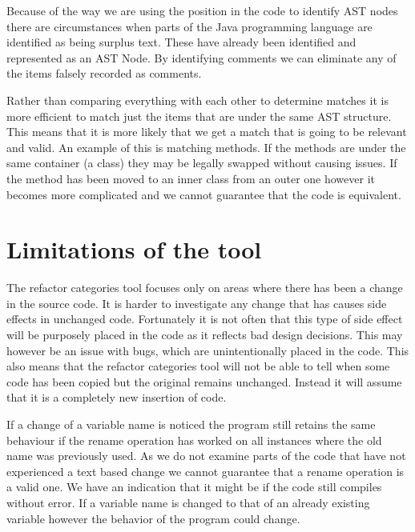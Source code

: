 Because of the way we are using the position in the code to identify AST nodes there are circumstances when parts of the Java programming language are identified as being surplus text. These have already been identified and represented as an AST Node. By identifying comments we can eliminate any of the items falsely recorded as comments.


% 
% 

Rather than comparing everything with each other to determine matches it is more efficient to match just the items that are under the same AST structure.  This means that it is more likely that we get a match that is going to be relevant and valid.  An example of this is matching methods. If the methods are under the same container (a class) they may be legally swapped without causing issues.  If the method has been moved to an inner class from an outer one however it becomes more complicated and we cannot guarantee that the code is equivalent.  

\section{Limitations of the tool}
The refactor categories tool focuses only on areas where there has been a change in the source code. 
It is harder to investigate any change that has causes side effects in unchanged code.  Fortunately it is not often that this type of side effect will be purposely placed in the code as it reflects bad design decisions.  This may however be an issue with bugs, which are unintentionally placed in the code.  
This also means that the refactor categories tool will not be able to tell when some code has been copied but the original remains unchanged. Instead it will assume that it is a completely new insertion of code.

If a change of a variable name is noticed the program still retains the same behaviour if the rename operation has worked on all instances where the old name was previously used.  As we do not examine parts of the code that have not experienced a text based change we cannot guarantee that a rename operation is a valid one. We have an indication that it might be if the code still compiles without error. If a variable name is changed to that of an already existing variable however the behavior of the program could change.
